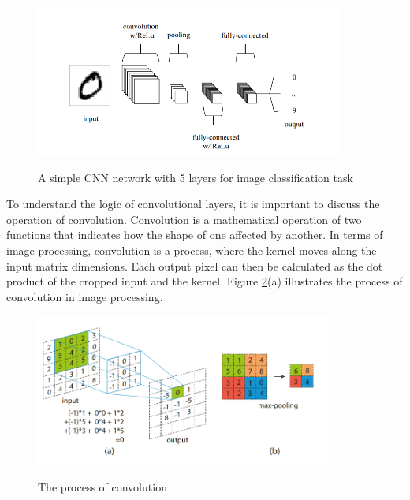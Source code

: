 \documentclass[english, 12pt, a4paper, elec, utf8, a-1b, online]{aaltothesis}
\begin{document}
\begin{figure}[htb]
	\begin{center}
		\includegraphics[height=5cm]{./CNN.png}
	\end{center}
	\caption{A simple CNN network with 5 layers for image classification task \cite{Mahony2019}}
	\begin{center}
		\label{CNN}
	\end{center}
\end{figure}
\FloatBarrier

To understand the logic of convolutional layers, it is important to discuss the operation of convolution. Convolution  is a mathematical operation of two functions that indicates how the shape of one affected by another. In terms of image processing, convolution is a process, where the kernel moves along the input matrix dimensions. Each output pixel can then be calculated as the dot product of the cropped input and the kernel.\cite{Liu2016} Figure \ref{CNN_1}(a) illustrates the process of convolution in image processing.  
\begin{figure}[htb]
	\begin{center}
		\includegraphics[height=5cm]{./CNN_1.png}
	\end{center}
	\caption{The process of convolution \cite{Liu2016}}
	\begin{center}
		\label{CNN_1}
	\end{center}
\end{figure}
\FloatBarrier
\end{document}
